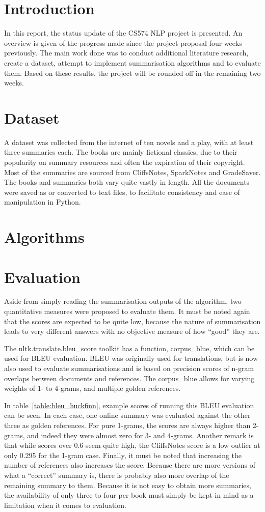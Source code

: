 \section{Introduction}
In this report, the status update of the CS574 NLP project is presented. An overview is given of the progress made since the project proposal four weeks previously. The main work done was to conduct additional literature research, create a dataset, attempt to implement summarisation algorithms and to evaluate them. Based on these results, the project will be rounded off in the remaining two weeks.

\section{Dataset}
A dataset was collected from the internet of ten novels and a play, with at least three summaries each. The books are mainly fictional classics, due to their popularity on summary resources and often the expiration of their copyright. Most of the summaries are sourced from CliffsNotes, SparkNotes and GradeSaver. The books and summaries both vary quite vastly in length. All the documents were saved as or converted to text files, to facilitate consistency and ease of manipulation in Python.

\section{Algorithms}

\section{Evaluation}
Aside from simply reading the summarisation outputs of the algorithm, two
quantitative measures were proposed to evaluate them. It must be noted again
that the scores are expected to be quite low, because the nature of
summarisation leads to very different answers with no objective measure of how
``good'' they are. 

The nltk.translate.bleu\_score toolkit has a function, corpus\_blue, which can
be used for BLEU evaluation. BLEU was originally used for translations, but is
now also used to evaluate summarisations and is based on precision scores of
n-gram overlaps between documents and references. The corpus\_blue allows for
varying weights of 1- to 4-grams, and multiple golden references. 

In table~\ref{table:bleu_huckfinn}, example scores of running this BLEU
evaluation can be seen. In each case, one online summary was evaluated against
the other three as golden references. For pure 1-grams, the scores are always
higher than 2-grams, and indeed they were almost zero for 3- and 4-grams.
Another remark is that while scores over 0.6 seem quite high, the CliffsNotes
score is a low outlier at only 0.295 for the 1-gram case. Finally, it must be
noted that increasing the number of references also increases the score.
Because there are more versions of what a ``correct'' summary is, there is
probably also more overlap of the remaining summary to them. Because it is not
easy to obtain more summaries, the availability of only three to four per book
must simply be kept in mind as a limitation when it comes to evaluation.

